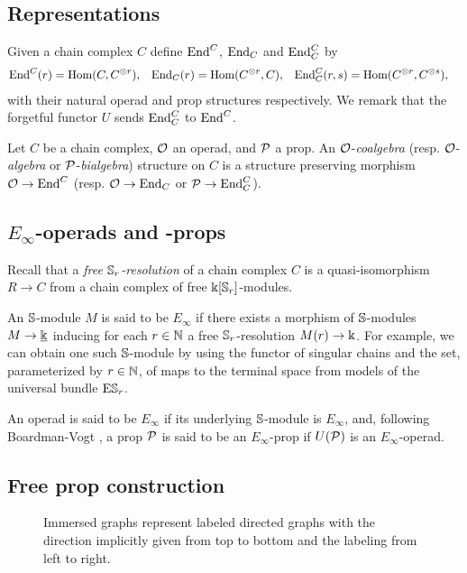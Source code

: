 \subsection{Representations}

Given a chain complex $C$ define $\End^C$, $\End_C$ and $\End_C^C$ by
\begin{align*}
\End^C(r) &= \Hom(C, C^{\otimes r}),
& \End_C(r) &= \Hom(C^{\otimes r}, C),
& \End^C_C(r, s) &= \Hom(C^{\otimes r}, C^{\otimes s}),
\end{align*}
with their natural operad and prop structures respectively.
We remark that the forgetful functor $U$ sends $\End^C_C$ to $\End^C$.

Let $C$ be a chain complex, $\O$ an operad, and $\P$ a prop.
An $\O$-\textit{coalgebra} (resp. $\O$-\textit{algebra} or $\P$-\textit{bialgebra}) structure on $C$ is a structure preserving morphism $\O \to \End^C$ (resp. $\O \to \End_C$ or $\P \to \End_C^C$).

\subsection{\texorpdfstring{$E_\infty$}{E-infty}-operads and -props}

Recall that a \textit{free $\S_r$-resolution} of a chain complex $C$ is a quasi-isomorphism $R \to C$ from a chain complex of free $\k[\S_r]$-modules.

An $\S$-module $M$ is said to be $E_{\infty}$ if there exists a morphism of $\S$-modules $M \to \underline{\k}$ inducing for each $r \in \N$ a free $\S_r$-resolution $M(r) \to \k$.
For example, we can obtain one such $\S$-module by using the functor of singular chains and the set, parameterized by $r \in \N$, of maps to the terminal space from models of the universal bundle $\mathrm{E} \S_r$.

An operad is said to be $E_{\infty}$ if its underlying $\S$-module is $E_\infty$, and, following Boardman-Vogt \cite{boardman1973homotopy}, a prop $\P$ is said to be an $E_\infty$-prop if $U(\P)$ is an $E_\infty$-operad.

\subsection{Free prop construction} \label{ss:free prop}

\begin{figure}
	
	\caption{Immersed graphs represent labeled directed graphs with the direction implicitly given from top to bottom and the labeling from left to right.}
	\label{f:immersion}
\end{figure}

